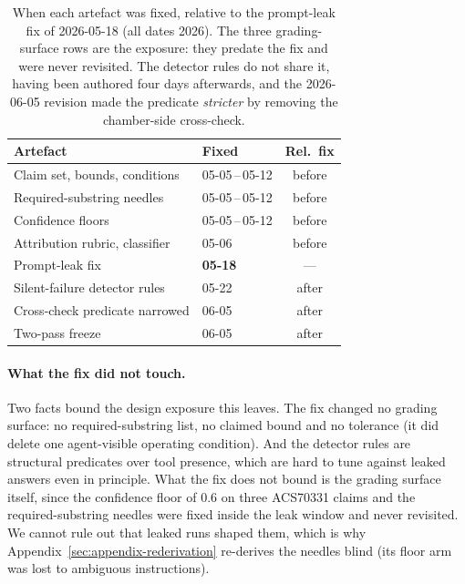 \documentclass[11pt]{article}
\begin{document}
\begin{table}[ht]
\centering
\small
\begin{tabular}{@{}llc@{}}
\toprule
\textbf{Artefact} & \textbf{Fixed} & \textbf{Rel.\ fix} \\
\midrule
Claim set, bounds, conditions   & 05-05\,--\,05-12 & before \\
Required-substring needles      & 05-05\,--\,05-12 & before \\
Confidence floors               & 05-05\,--\,05-12 & before \\
Attribution rubric, classifier  & 05-06            & before \\
\midrule
Prompt-leak fix                 & \textbf{05-18}   & --- \\
\midrule
Silent-failure detector rules   & 05-22            & after \\
Cross-check predicate narrowed  & 06-05            & after \\
Two-pass freeze                 & 06-05            & after \\
\bottomrule
\end{tabular}
\caption{When each artefact was fixed, relative to the prompt-leak fix
of 2026-05-18 (all dates 2026). The three grading-surface rows are the
exposure: they predate the fix and were never revisited. The detector
rules do not share it, having been authored four days afterwards, and
the 2026-06-05 revision made the predicate \emph{stricter} by removing
the chamber-side cross-check.}
\label{tab:provenance}
\end{table}

\paragraph{What the fix did not touch.}
Two facts bound the design exposure this leaves. The fix changed no
grading surface: no required-substring list, no claimed bound and no
tolerance (it did delete one agent-visible operating condition). And the
detector rules are structural predicates over tool presence, which are
hard to tune against leaked answers even in principle. What the fix does
not bound is the grading surface itself, since the confidence floor of
0.6 on three ACS70331 claims and the required-substring needles were
fixed inside the leak window and never revisited. We cannot rule out
that leaked runs shaped them, which is why
Appendix~\ref{sec:appendix-rederivation} re-derives the needles blind
(its floor arm was lost to ambiguous instructions).
\end{document}

